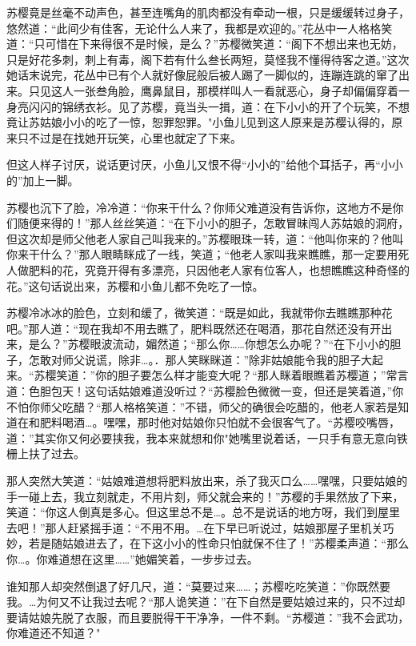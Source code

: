 \documentclass[12pt,oneside]{book}
\begin{document}
苏樱竟是丝毫不动声色，甚至连嘴角的肌肉都没有牵动一根，只是缓缓转过身子，悠然道：``此间少有佳客，无论什么人来了，我都是欢迎的。''花丛中一人格格笑道：``只可惜在下来得很不是时候，是么？''苏樱微笑道：``阁下不想出来也无妨，只是好花多刺，刺上有毒，阁下若有什么叁长两短，莫怪我不懂得待客之道。''这次她话末说完，花丛中已有个人就好像屁般后被人踢了一脚似的，连蹦连跳的窜了出来。只见这人一张叁角脸，鹰鼻鼠目，那模样叫人一看就恶心，身子却偏偏穿着一身亮闪闪的锦绣衣衫。见了苏樱，竟当头一揖，道：在下小小的开了个玩笑，不想竟让苏姑娘小小的吃了一惊，恕罪恕罪。"小鱼儿见到这人原来是苏樱认得的，原来只不过是在找她开玩笑，心里也就定了下来。

但这人样子讨厌，说话更讨厌，小鱼儿又恨不得``小小的''给他个耳括子，再``小小的''加上一脚。

苏樱也沉下了脸，冷冷道：``你来干什么？你师父难道没有告诉你，这地方不是你们随便来得的！''那人丝丝笑道：``在下小小的胆子，怎敢冒昧闯人苏姑娘的洞府，但这次却是师父他老人家自己叫我来的。''苏樱眼珠一转，道：``他叫你来的？他叫你来干什么？''那人眼睛眯成了一线，笑道；``他老人家叫我来瞧瞧，那一定要用死人做肥料的花，究竟开得有多漂亮，只因他老人家有位客人，也想瞧瞧这种奇怪的花。''这句话说出来，苏樱和小鱼儿都不免吃了一惊。

苏樱冷冰冰的脸色，立刻和缓了，微笑道：``既是如此，我就带你去瞧瞧那种花吧。''那人道：``现在我却不用去瞧了，肥料既然还在喝酒，那花自然还没有开出来，是么？''苏樱眼波流动，媚然道；``那么你\ldots\ldots 你想怎么办呢？''``在下小小的胆子，怎敢对师父说谎，除非\ldots。．那人笑眯眯道：''除非姑娘能令我的胆子大起来。``苏樱笑道：''你的胆子要怎么样才能变大呢？``那人眯着眼瞧着苏樱道；''常言道：色胆包天！这句话姑娘难道没听过？``苏樱脸色微微一变，但还是笑着道，''你不怕你师父吃醋？``那人格格笑道：''不错，师父的确很会吃醋的，他老人家若是知道在和肥料喝酒\ldots。嘿嘿，那时他对姑娘你只怕就不会很客气了。``苏樱咬嘴唇，道：''其实你又何必要挟我，我本来就想和你"她嘴里说着话，一只手有意无意向铁栅上扶了过去。

那人突然大笑道：``姑娘难道想将肥料放出来，杀了我灭口么\ldots\ldots 嘿嘿，只要姑娘的手一碰上去，我立刻就走，不用片刻，师父就会来的！''苏樱的手果然放了下来，笑道：``你这人倒真是多心。但这里总不是\ldots。总不是说话的地方呀，我们到屋里去吧！''那人赶紧摇手道：``不用不用。\ldots 在下早已听说过，姑娘那屋子里机关巧妙，若是随姑娘进去了，在下这小小的性命只怕就保不住了！''苏樱柔声道：``那么你\ldots。你难道想在这里\ldots\ldots{}''她媚笑着，一步步过去。

谁知那人却突然倒退了好几尺，道：``莫要过来\ldots\ldots；苏樱吃吃笑道：''你既然要我。\ldots 为何又不让我过去呢？``那人诡笑道：''在下自然是要姑娘过来的，只不过却要请姑娘先脱了衣服，而且要脱得干干净净，一件不剩。``苏樱道：''我不会武功，你难道还不知道？"
\end{document}
